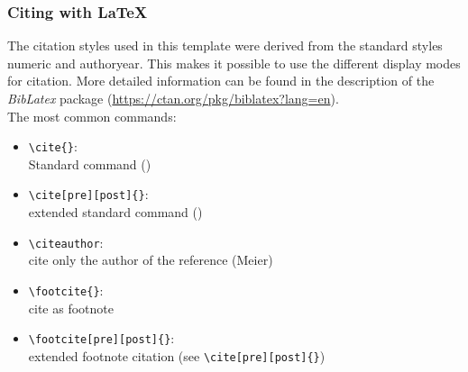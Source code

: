 \subsubsection{Citing with \LaTeX}
The citation styles used in this template were derived from the standard styles \textsf{numeric} and \textsf{authoryear}. This makes it possible to use the different display modes for citation. More detailed information can be found in the description of the \textit{BibLatex} package (\url{https://ctan.org/pkg/biblatex?lang=en}).\newline
\\The most common commands:
\begin{itemize}
	\item \verb|\cite{}|:\\ Standard command (\eg [Meier, 2011])
	\item \verb|\cite[pre][post]{}|:\\ extended standard command ()
	\item \verb|\citeauthor|:\\ cite only the author of the reference (\eg Meier)
	\item \verb|\footcite{}|:\\ cite as footnote
	\item \verb|\footcite[pre][post]{}|:\\ extended footnote citation (see \verb|\cite[pre][post]{}|)
\end{itemize}

